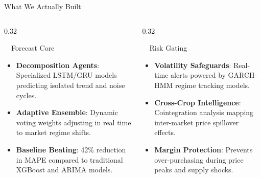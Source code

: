 \documentclass{beamer}
\begin{document}
\begin{frame}{What We Actually Built}
\vspace{-0.2cm}

\begin{columns}[T]
    \begin{column}{0.32\textwidth}
        \begin{infocard}[height=5.2cm]{~~Forecast Core}
            \fontsize{6.2pt}{7.5pt}\selectfont
            \begin{itemize}\setlength\itemsep{4.5pt}\setlength\parskip{0pt}
                \item \textbf{Decomposition Agents}: Specialized LSTM/GRU models predicting isolated trend and noise cycles.
                \item \textbf{Adaptive Ensemble}: Dynamic voting weights adjusting in real time to market regime shifts.
                \item \textbf{Baseline Beating}: 42\% reduction in MAPE compared to traditional XGBoost and ARIMA models.
            \end{itemize}
        \end{infocard}
    \end{column}
    
    \begin{column}{0.32\textwidth}
        \begin{alertcard}[height=5.2cm]{~~Risk Gating}
            \fontsize{6.2pt}{7.5pt}\selectfont
            \begin{itemize}\setlength\itemsep{4.5pt}\setlength\parskip{0pt}
                \item \textbf{Volatility Safeguards}: Real-time alerts powered by GARCH-HMM regime tracking models.
                \item \textbf{Cross-Crop Intelligence}: Cointegration analysis mapping inter-market price spillover effects.
                \item \textbf{Margin Protection}: Prevents over-purchasing during price peaks and supply shocks.
            \end{itemize}
        \end{alertcard}
    \end{column}
    

\end{columns}
\end{frame}
\end{document}

